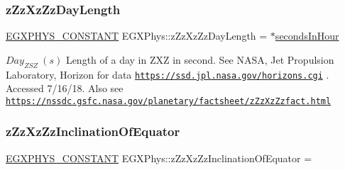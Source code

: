 \subsubsection{\texorpdfstring{z\+Zz\+Xz\+Zz\+Day\+Length}{zZzXzZzDayLength}}
{\footnotesize\ttfamily \mbox{\hyperlink{group___e_g_x_phys-_constants-_macros_ga76980d288494ce1714c9ac68a95ba702}{E\+G\+X\+P\+H\+Y\+S\+\_\+\+C\+O\+N\+S\+T\+A\+NT}} E\+G\+X\+Phys\+::z\+Zz\+Xz\+Zz\+Day\+Length = $\ast$\mbox{\hyperlink{namespace_e_g_x_phys_a7c3165cd93e36f1fb8e9fef80f117bef}{seconds\+In\+Hour}}}

$ Day_{ZSZ} \ (s)$ Length of a day in Z\+XZ in second. See N\+A\+SA, Jet Propulsion Laboratory, Horizon for data \href{https://ssd.jpl.nasa.gov/horizons.cgi}{\tt https\+://ssd.\+jpl.\+nasa.\+gov/horizons.\+cgi} . Accessed 7/16/18. Also see \href{https://nssdc.gsfc.nasa.gov/planetary/factsheet/zZzXzZzfact.html}{\tt https\+://nssdc.\+gsfc.\+nasa.\+gov/planetary/factsheet/z\+Zz\+Xz\+Zzfact.\+html} \mbox{\label{group___e_g_x_phys-_constants-_astrophysics-_solar_system-_z_x_z-_orbit_ga55e1aae014db69dae2f9bd7b264358ff}} 
\subsubsection{\texorpdfstring{z\+Zz\+Xz\+Zz\+Inclination\+Of\+Equator}{zZzXzZzInclinationOfEquator}}
{\footnotesize\ttfamily \mbox{\hyperlink{group___e_g_x_phys-_constants-_macros_ga76980d288494ce1714c9ac68a95ba702}{E\+G\+X\+P\+H\+Y\+S\+\_\+\+C\+O\+N\+S\+T\+A\+NT}} E\+G\+X\+Phys\+::z\+Zz\+Xz\+Zz\+Inclination\+Of\+Equator =}

